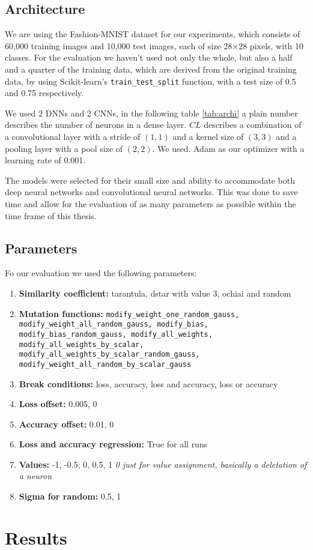\subsection{Architecture}\label{subsec:architecture}
We are using the Fashion-MNIST dataset\cite{xiao_fashion-mnist_2017} for our experiments, which consists of 60,000 training images and 10,000 test images, each of size 28×28 pixels, with 10 classes.
For the evaluation we haven't used not only the whole, but also a half and a quarter of the training data, which are derived from the original training data, by using Scikit-learn's\cite{pedregosa_scikit-learn_2011} \texttt{train\_test\_split} function, with a test size of 0.5 and 0.75 respectively.

We used 2 DNNs and 2 CNNs, in the following table \ref{tab:archi} a plain number describes the number of neurons in a dense layer. $CL$ describes a combination of a convolutional layer with a stride of $(1,1)$ and a kernel size of $(3,3)$ and a pooling layer with a pool size of $(2,2)$. We used.
Adam as our optimizer with a learning rate of 0.001.

The models were selected for their small size and ability to accommodate both deep neural networks and convolutional neural networks.
This was done to save time and allow for the evaluation of as many parameters as possible within the time frame of this thesis.

\subsection{Parameters}\label{subsec:parameters}
Fo our evaluation we used the following parameters:
\begin{enumerate}
    \item[]\textbf{Similarity coefficient:} tarantula, dstar with value 3, ochiai and random
    \item[]\textbf{Mutation functions:} \texttt{modify\_weight\_one\_random\_gauss,\\ modify\_weight\_all\_random\_gauss, modify\_bias, modify\_bias\_random\_gauss, modify\_all\_weights, modify\_all\_weights\_by\_scalar,\\modify\_all\_weights\_by\_scalar\_random\_gauss,\\modify\_weight\_all\_random\_by\_scalar\_gauss}
    \item[]\textbf{Break conditions:} loss, accuracy, loss and accuracy, loss or accuracy
    \item[]\textbf{Loss offset:} 0.005, 0
    \item[]\textbf{Accuracy offset:} 0.01, 0
    \item[]\textbf{Loss and accuracy regression:} True for all runs
    \item[]\textbf{Values:} -1, -0.5, 0, 0.5, 1 \textit{0 just for value assignment, basically a deletation of a neuron}
    \item[]\textbf{Sigma for random:} 0.5, 1
\end{enumerate}
\section{Results}\label{sec:results}


